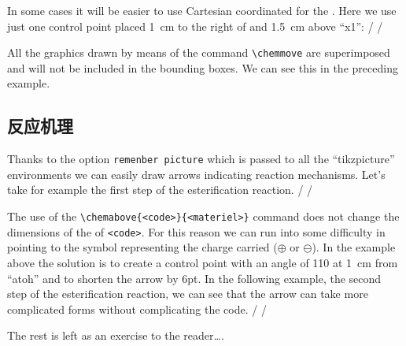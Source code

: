 \documentclass[10pt]{article}
\begin{document}
In some cases it will be easier to use Cartesian coordinated for the . Here we use just one control point placed 1~cm to the right of and 1.5~cm above ``x1'':
/
\hspace{2cm}
/

All the graphics drawn by means of the command \verb|\chemmove| are superimposed and will not be included in the bounding boxes. We can see this in the preceding example.

\subsection{反应机理}
Thanks to the option \verb|remenber picture| which is passed to all the ``tikzpicture'' environments we can easily draw arrows indicating reaction mechanisms. Let's take for example the first step of the esterification reaction.
/\setatomsep{7mm}
\setchemrel{}{}{5mm}
\chemsign{+}
/

The use of the \verb|\chemabove{<code>}{<materiel>}|\idx*{\chemabove} command does not change the dimensions of the  of \verb|<code>|. For this reason we can run into some difficulty in pointing to the symbol representing the charge carried ($\oplus$ or $\ominus$). In the example above the solution is to create a control point with an angle of 110\degres{} at 1~cm from ``atoh'' and to shorten the arrow by 6pt. In the following example, the second step of the esterification reaction, we can see that the arrow can take more complicated forms without complicating the code.
/\setatomsep{7mm}
\setchemrel{}{}{5mm}
\hspace{1cm}
/

The rest is left as an exercise to the reader\dots.
\end{document}
